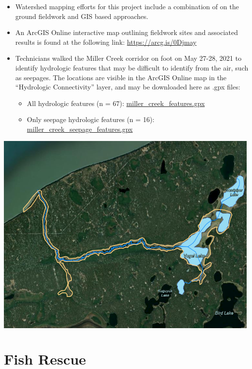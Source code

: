 \documentclass[
]{book}
\begin{document}
\begin{itemize}
\item
  Watershed mapping efforts for this project include a combination of on the ground fieldwork and GIS based approaches.
\item
  An ArcGIS Online interactive map outlining fieldwork sites and associated results is found at the following link: \url{https://arcg.is/0Djmay}
\item
  Technicians walked the Miller Creek corridor on foot on May 27-28, 2021 to identify hydrologic features that may be difficult to identify from the air, such as seepages. The locations are visible in the ArcGIS Online map in the ``Hydrologic Connectivity'' layer, and may be downloaded here as .gpx files:

  \begin{itemize}
  \item
    All hydrologic features (n = 67): \href{https://drive.google.com/file/d/1PQu1v6nTD6MB3YStwBF3mgV0wydKziIa/view?usp=sharing}{miller\_creek\_features.gpx}
  \item
    Only seepage hydrologic features (n = 16): \href{https://drive.google.com/file/d/1_c4FQDR0t2sW_yphFuuiSpRmydPzjR3i/view?usp=sharing}{miller\_creek\_seepage\_features.gpx}
  \end{itemize}
\end{itemize}

\href{https://arcg.is/1GeLTX}{\includegraphics[width=5.20833in,height=\textheight]{images/miller_map.png}}

\hypertarget{fish-rescue}{%
\chapter{Fish Rescue}\label{fish-rescue}}
\end{document}
